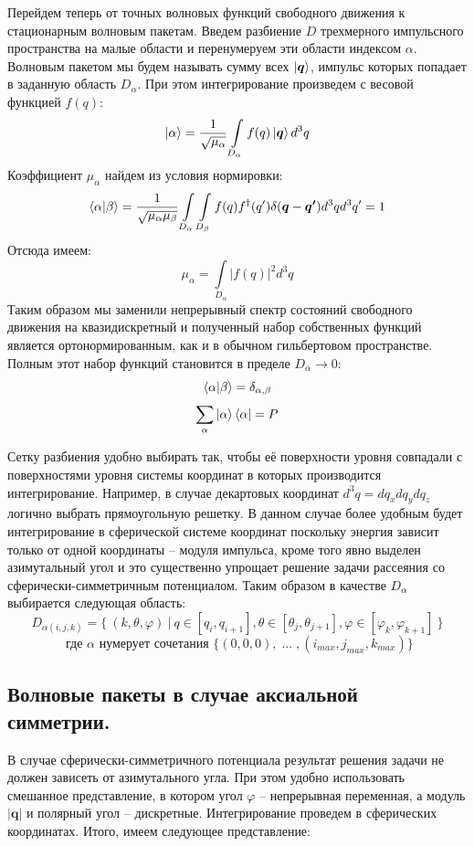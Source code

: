 \documentclass[a4paper,12pt]{article}
\newcommand{\vect}[1]{\boldsymbol{#1}}
\begin{document}
Перейдем теперь от точных волновых функций свободного движения к стационарным волновым пакетам. Введем разбиение $D$ трехмерного импульсного пространства на малые области и перенумеруем эти области индексом $\alpha$. Волновым пакетом мы будем называть сумму всех $\ket{\vect{q}}$, импульс которых попадает в заданную область $D_\alpha$. При этом интегрирование произведем с весовой функцией $f(q)$:
\[
	\ket{\alpha} = \frac{1}{\sqrt{\mu_\alpha}} \int\limits_{D_\alpha} f(q) \ket{\vect{q}} d^3q
\]
Коэффициент $\mu_\alpha$ найдем из условия нормировки:
\[
	\braket{\alpha|\beta} = \frac{1}{\sqrt{\mu_\alpha \mu_\beta}}  \int\limits_{D_\alpha}  \int\limits_{D_\beta} f(q)f^\dagger(q') \delta(\vect{q} - \vect{q'}) d^3q d^3q' = 1
\]
Отсюда имеем:
\[
	\mu_\alpha =  \int\limits_{D_\alpha} |f(q)|^2 d^3q
\]
Таким образом мы заменили непрерывный спектр состояний свободного движения на квазидискретный и полученный набор собственных функций является ортонормированным, как и в обычном гильбертовом пространстве. Полным этот набор функций становится в пределе $D_\alpha \to 0$:
\[
	\braket{\alpha|\beta} = \delta_{\alpha,\beta}
\]\[
	\sum\limits_\alpha \ket{\alpha}\bra{\alpha} = P
\]

Сетку разбиения удобно выбирать так, чтобы её поверхности уровня совпадали с поверхностями уровня системы координат в которых производится интегрирование. Например, в случае декартовых координат $d^3q = dq_xdq_ydq_z$ логично выбрать прямоугольную решетку. В данном случае более удобным будет интегрирование в сферической системе координат поскольку энергия зависит только от одной координаты – модуля импульса, кроме того явно выделен азимутальный угол и это существенно упрощает решение задачи рассеяния со сферически-симметричным потенциалом. Таким образом в качестве $D_\alpha$ выбирается следующая область:
\[
 D_{\alpha(i,j,k)} = \big\{ \: (k,\theta,\varphi) \: \big| \: q \in [q_i,q_{i+1}], \theta \in [\theta_j,\theta_{j+1}], \varphi \in [\varphi_k,\varphi_{k+1}] \: \big\} 
\]\[
 \text{ где } \alpha \text{ нумерует сочетания } \big\{ (0,0,0), \; ... \; , (i_{max},j_{max},k_{max}) \big\}
\]
\newline
	\subsection{Волновые пакеты в случае аксиальной симметрии.}
В случае сферически-симметричного потенциала результат решения задачи не должен зависеть от азимутального угла. При этом удобно использовать смешанное представление, в котором угол $\varphi$ – непрерывная переменная, а модуль $|\vect{q}|$ и полярный угол – дискретные. Интегрирование проведем в сферических координатах. Итого, имеем следующее представление:
\end{document}
